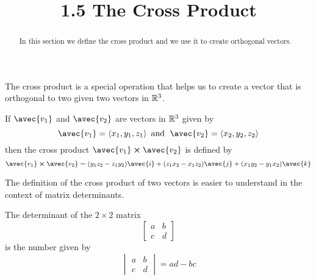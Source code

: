 \documentclass[handout]{ximera}
\title{1.5 The Cross Product}
\begin{document}
\begin{abstract}
In this section we define the cross product and we use it to create orthogonal vectors.
\end{abstract}
 
\maketitle
The cross product is a special operation that helps us to create a vector that is orthogonal to two given two vectors in $\mathbb R^3$.
\begin{definition}
If $\avec{v_1}$ and $\avec{v_2}$ are vectors in $\mathbb R^3$ given by
\[
\avec{v_1} = \vector{x_1, y_1, z_1} \text{  and   } \;\avec{v_2} = \vector{x_2, y_2, z_2}
\]
then the cross product $\avec{v_1} \cross \avec{v_2}$ is defined by
\[
\avec{v_1} \cross \avec{v_2} =  (y_1z_2 - z_1y_2) \avec{i} + (z_1x_2 - x_1z_2) \avec{j} + (x_1y_2 - y_1x_2) \avec{k} 
\]
\end{definition}

The definition of the cross product of two vectors is easier to understand in the context of matrix determinants.

\begin{definition}
The determinant of the $2 \times 2$ matrix 
\[
\begin{bmatrix}
a & b\\
c & d
\end{bmatrix}
\]
is the number given by
\[
\begin{vmatrix}
a & b\\
c & d
\end{vmatrix}
= ad-bc
\]

\end{definition}
\end{document}
